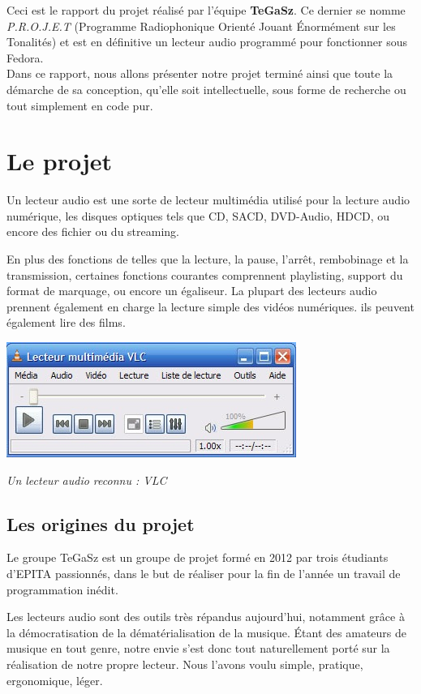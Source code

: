 \documentclass[12pt,a4paper]{report}
\begin{document}
Ceci est le rapport du projet réalisé par l'équipe \textbf{TeGaSz}. 
Ce dernier se nomme \emph{P.R.O.J.E.T} (Programme Radiophonique Orienté Jouant Énormément sur les Tonalités) et est en définitive un lecteur audio programmé pour fonctionner sous Fedora. \\
Dans ce rapport, nous allons présenter notre projet terminé ainsi
que toute la démarche de sa conception, qu'elle soit intellectuelle, sous forme de 
recherche ou tout simplement en code pur.

\chapter{Le projet}
Un lecteur audio est une sorte de lecteur multimédia utilisé pour la lecture audio numérique, les disques optiques tels que CD, SACD, DVD-Audio, HDCD, ou encore  des fichier ou du streaming.

En plus des fonctions de telles que la lecture, la pause, l'arrêt, rembobinage et la transmission, certaines fonctions courantes comprennent playlisting, support du format de marquage, ou encore un égaliseur.
La plupart des lecteurs audio prennent également en charge la lecture simple des vidéos numériques. ils peuvent également lire des films.

\begin{center}
\includegraphics{vlc-interface1.jpg}

\it{Un lecteur audio reconnu : VLC}
\end{center}

\section{Les origines du projet}

Le groupe TeGaSz est un groupe de projet formé en 2012 par trois étudiants
d'EPITA passionnés, dans le but de réaliser pour la fin de l'année un
travail de programmation inédit. 

Les lecteurs audio sont des outils très répandus aujourd'hui, notamment grâce à la démocratisation de la dématérialisation de la musique. Étant des amateurs de musique en tout genre, notre envie s'est donc tout naturellement porté sur la réalisation de notre propre lecteur. Nous l'avons voulu simple, pratique, ergonomique, léger.
\end{document}
